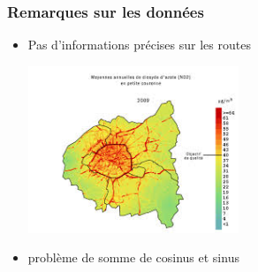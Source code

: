 \documentclass{beamer}
\begin{document}
\begin{frame}
\frametitle{Remarques sur les données}
\begin{itemize}
	\item Pas d'informations précises sur les routes
    \begin{center}
    	\includegraphics[height=5cm]{images/parisno2.jpg}
    \end{center}
  \item problème de somme de cosinus et sinus
\end{itemize}
\end{frame}
\end{document}
